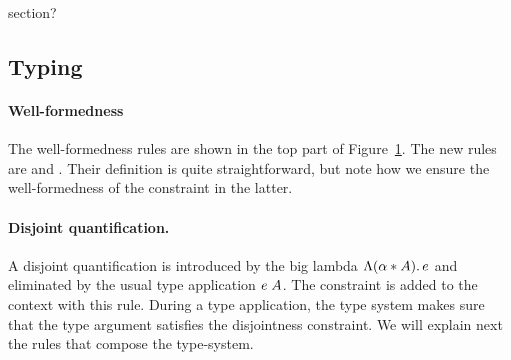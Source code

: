 section?

%
%

\subsection{Typing}

\begin{figure}[!t]
  \label{fig:wf}
\end{figure}



\paragraph{Well-formedness}
The well-formedness rules are shown in the top part of Figure~\ref{fig:wf}. 
The new rules are  and
. 
Their definition is quite straightforward, but note how we ensure the well-formedness 
of the constraint in the latter. 

\paragraph{Disjoint quantification.} A disjoint quantification is introduced by
the big lambda $\Lambda (\alpha * A).\, e$ and eliminated by the usual type application 
$e \; A$. 
The constraint is added to the context with this rule. 
During a type application, the type system makes sure that the type argument
satisfies the disjointness constraint.
We will explain next the rules that compose the type-system.

